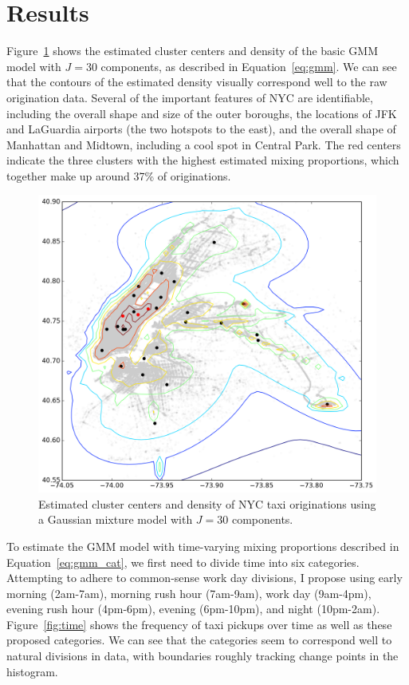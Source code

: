 \documentclass[12pt]{article}
\theoremstyle{definition}
\theoremstyle{algodesc}
\begin{document}
\section{Results}
Figure~\ref{fig:gmm_res} shows the estimated cluster centers and density of the basic GMM model with $J=30$ components, as described in Equation~\ref{eq:gmm}. We can see that the contours of the estimated density visually correspond well to the raw origination data. Several of the important features of NYC are identifiable, including the overall shape and size of the outer boroughs, the locations of JFK and LaGuardia airports (the two hotspots to the east), and the overall shape of Manhattan and Midtown, including a cool spot in Central Park. The red centers indicate the three clusters with the highest estimated mixing proportions, which together make up around 37\% of originations.

\begin{figure}[tb] \centering
  \includegraphics[width=0.8\linewidth]{./include/gmm_res.png}
  \caption{Estimated cluster centers and density of NYC taxi originations using a Gaussian mixture model with $J=30$ components.}
  \label{fig:gmm_res}
\end{figure}

To estimate the GMM model with time-varying mixing proportions described in Equation~\ref{eq:gmm_cat}, we first need to divide time into six categories. Attempting to adhere to common-sense work day divisions, I propose using early morning (2am-7am), morning rush hour (7am-9am), work day (9am-4pm), evening rush hour (4pm-6pm), evening (6pm-10pm), and night (10pm-2am). Figure~\ref{fig:time} shows the frequency of taxi pickups over time as well as these proposed categories. We can see that the categories seem to correspond well to natural divisions in data, with boundaries roughly tracking change points in the histogram.
\end{document}
